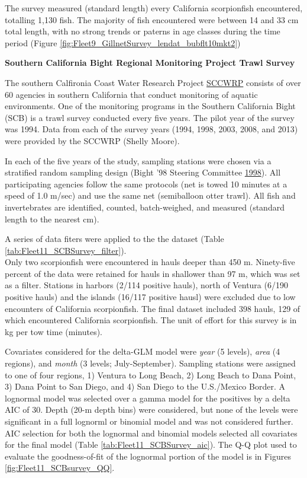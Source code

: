 \documentclass[12pt,]{article}
\begin{document}
The survey measured (standard length) every California scorpionfish
encountered, totalling 1,130 fish. The majority of fish encountered were
between 14 and 33 cm total length, with no strong trends or paterns in
age classes during the time period (Figure
\ref{fig:Fleet9_GillnetSurvey_lendat_bubflt10mkt2})

\textbf{Southern California Bight Regional Monitoring Project Trawl
Survey}

The southern Calfironia Coast Water Research Project
\href{http://www.sccwrp.org/Homepage.aspx}{SCCWRP} consists of over 60
agencies in southern California that conduct monitoring of aquatic
environments. One of the monitoring programs in the Southern California
Bight (SCB) is a trawl survey conducted every five years. The pilot year
of the survey was 1994. Data from each of the survey years (1994, 1998,
2003, 2008, and 2013) were provided by the SCCWRP (Shelly Moore).

In each of the five years of the study, sampling stations were chosen
via a stratified random sampling design (Bight '98 Steering Committee
\protect\hyperlink{ref-Bight1998}{1998}). All participating agencies
follow the same protocols (net is towed 10 minutes at a speed of 1.0
m/sec) and use the same net (semiballoon otter trawl). All fish and
invertebrates are identified, counted, batch-weighed, and measured
(standard length to the nearest cm).

A series of data fiters were applied to the the dataset (Table
\ref{tab:Fleet11_SCBSurvey_filter}).\\
Only two scorpionfish were encountered in hauls deeper than 450 m.
Ninety-five percent of the data were retained for hauls in shallower
than 97 m, which was set as a filter. Stations in harbors (2/114
positive hauls), north of Ventura (6/190 positive hauls) and the islands
(16/117 positive hausl) were excluded due to low encounters of
California scorpionfish. The final dataset included 398 hauls, 129 of
which encountered California scorpionfish. The unit of effort for this
survey is in kg per tow time (minutes).

Covariates considered for the delta-GLM model were \emph{year} (5
levels), \emph{area} (4 regions), and \emph{month} (3 levels;
July-September). Sampling stations were assigned to one of four regions,
1) Ventura to Long Beach, 2) Long Beach to Dana Point, 3) Dana Point to
San Diego, and 4) San Diego to the U.S./Mexico Border. A lognormal model
was selected over a gamma model for the positives by a delta AIC of 30.
Depth (20-m depth bins) were considered, but none of the levels were
significant in a full lognorml or binomial model and was not considered
further. AIC selection for both the lognormal and binomial models
selected all covariates for the final model (Table
\ref{tab:Fleet11_SCBSurvey_aic}). The Q-Q plot used to evaluate the
goodness-of-fit of the lognormal portion of the model is in Figures
\ref{fig:Fleet11_SCBsurvey_QQ}.
\end{document}
